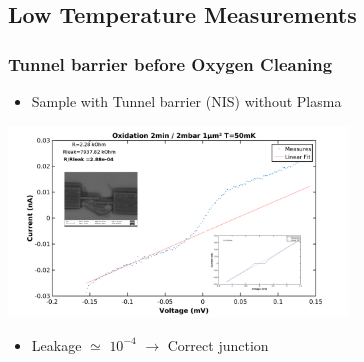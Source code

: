 \documentclass[handout]{beamer}
\begin{document}
    \subsection{Low Temperature Measurements}
    \begin{frame}
        \frametitle{Tunnel barrier before Oxygen Cleaning}
        
        \begin{itemize}
            \item Sample with Tunnel barrier (NIS) without Plasma
            \end{itemize}
            
            \centering\includegraphics[width=90mm]{BeforeLISAOx.png}\\
        \begin{itemize}    
        \item Leakage $\simeq$ $10^{-4}$ $\rightarrow$ Correct junction
        \end{itemize}
        
    \end{frame}
    
%         
%             
        
\end{document}
